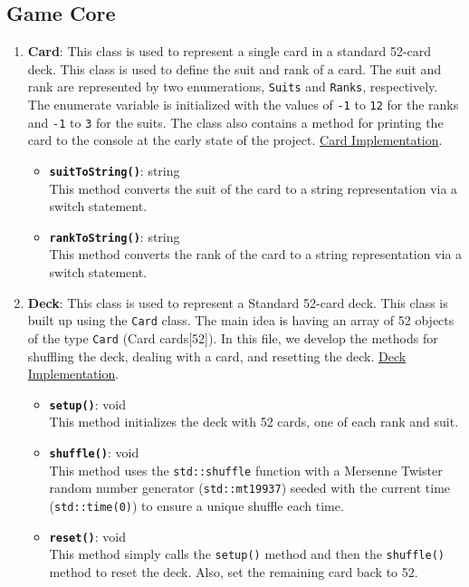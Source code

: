 \subsection{Game Core}
\label{subsec:game-core}
\begin{enumerate}
    \item \textbf{Card}: This class is used to represent a single card in a standard 52-card deck. This class is used to define the suit and rank of a card. The suit and rank are represented by two enumerations, \texttt{Suits} and \texttt{Ranks}, respectively. The enumerate variable is initialized with the values of \texttt{-1} to \texttt{12} for the ranks and \texttt{-1} to \texttt{3} for the suits. The class also contains a method for printing the card to the console at the early state of the project. \href{https://github.com/anhtri2407/Poker/blob/main/src/core/Card.cpp}{Card Implementation}.
    \begin{itemize}
        \item \texttt{\textbf{suitToString()}}: string \\ This method converts the suit of the card to a string representation via a switch statement.
        \item \texttt{\textbf{rankToString()}}: string \\ This method converts the rank of the card to a string representation via a switch statement.
    \end{itemize}

    \item \textbf{Deck}: This class is used to represent a Standard 52-card deck. This class is built up using the \texttt{Card} class. The main idea is having an array of 52 objects of the type \texttt{Card} (Card cards[52]). In this file, we develop the methods for shuffling the deck, dealing with a card, and resetting the deck. \href{https://github.com/anhtri2407/Poker/blob/main/src/core/Deck.cpp}{Deck Implementation}.
    \begin{itemize}
        \item \texttt{\textbf{setup()}}: void \\ This method initializes the deck with 52 cards, one of each rank and suit.
        \item \texttt{\textbf{shuffle()}}: void \\ This method uses the \texttt{std::shuffle} function with a Mersenne Twister random number generator (\texttt{std::mt19937}) seeded with the current time (\texttt{std::time(0)}) to ensure a unique shuffle each time.
        \item \texttt{\textbf{reset()}}: void \\ This method simply calls the \texttt{setup()} method and then the \texttt{shuffle()} method to reset the deck. Also, set the remaining card back to 52.
    \end{itemize}


\end{enumerate}
